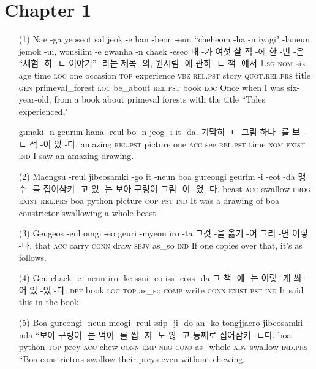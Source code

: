 \section*{Chapter 1}

\begin{itemize}
\item [(1)]
\tgl
		{Nae -ga yeoseot sal jeok -e han -beon -eun ``cheheom -ha -n iyagi" -laneun jemok -ui, wonsilim -e gwanha -n chaek -eseo}
		{내 -가 여섯 살 적 -에 한 -번 -은 ``체험 -하 -ㄴ 이야기” -라는 제목 -의, 원시림 -에 관하 -ㄴ 책 -에서}
		{\textsc{1.sg} \textsc{nom} six age time \textsc{loc} one occasion \textsc{top}	experience \textsc{vbz} \textsc{rel.pst} story \textsc{quot.rel.prs} title \textsc{gen} primeval\_forest \textsc{loc} be\_about \textsc{rel.pst} book \textsc{loc}}
		{Once when I was six-year-old, from a book about primeval forests with the title ``Tales experienced,"}
		
\tgl
		{gimaki -n geurim hana -reul bo -n jeog -i it -da.}
		{기막히 -ㄴ 그림 하나 -를 보 -ㄴ 적 -이 있 -다.}
		{amazing \textsc{rel.pst} picture one \textsc{acc} see \textsc{rel.pst} time \textsc{nom} \textsc{exist} \textsc{ind}}
		{I saw an amazing drawing.}

\item [(2)]
\tgl
		{Maengsu -reul jibeosamki -go it -neun boa gureongi geurim -i -eot -da}
		{맹수 -를 집어삼키 -고 있 -는 보아 구렁이 그림 -이 -었 -다.}
		{beast \textsc{acc} swallow \textsc{prog} \textsc{exist} \textsc{rel.prs} boa python picture \textsc{cop} \textsc{pst} \textsc{ind}}
		{It was a drawing of boa constrictor swallowing a whole beast.}

\item [(3)]
\tgl
		{Geugeos -eul omgi -eo geuri -myeon iro -ta}
		{그것 -을 옮기 -어 그리 -면 이렇 -다.}
		{that \textsc{acc} carry \textsc{conn} draw \textsc{sbjv} as\_so \textsc{ind}}
		{If one copies over that, it's as follows.}

\item [(4)]
\tgl
		{Geu chaek -e -neun iro -ke ssui -eo iss -eoss -da}
		{그 책 -에 -는 이렇 -게 씌 -어 있 -었 -다.}
		{\textsc{def} book \textsc{loc} \textsc{top} as\_so \textsc{comp} write \textsc{conn} \textsc{exist} \textsc{pst} \textsc{ind}}
		{It said this in the book.}

\item [(5)]
\tgl
		{Boa gureongi -neun meogi -reul ssip -ji -do an -ko tongjjaero jibeosamki -nda}
		{``보아 구렁이 -는 먹이 -를 씹 -지 -도 않 -고 통째로 집어삼키 -ㄴ다.}
		{boa python \textsc{top} prey \textsc{acc} chew \textsc{conn} \textsc{emp} \textsc{neg} \textsc{conj} as\_whole \textsc{adv} swallow \textsc{ind.prs}}
		{``Boa constrictors swallow their preys even without chewing.}


\end{itemize}
